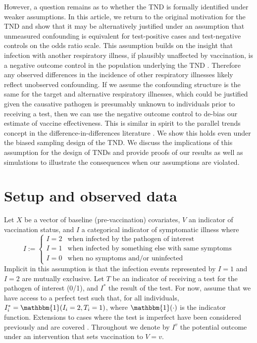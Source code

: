 \documentclass[11pt]{article}
\begin{document}
However, a question remains as to whether the TND is formally identified under weaker assumptions. In this article, we return to the original motivation for the TND and show that it may be alternatively justified under an assumption that unmeasured confounding is equivalent for test-positive cases and test-negative controls on the odds ratio scale. This assumption builds on the insight that infection with another respiratory illness, if plausibly unaffected by vaccination, is a negative outcome control in the population underlying the TND \cite{lipsitch_negative_2010,shi_selective_2020}. Therefore any observed differences in the incidence of other respiratory illnesses likely reflect unobserved confounding. If we assume the confounding structure is the same for the target and alternative respiratory illnesses, which could be justified given the causative pathogen is presumably unknown to individuals prior to receiving a test, then we can use the negative outcome control to de-bias our estimate of vaccine effectiveness. This is similar in spirit to the parallel trends concept in the difference-in-differences literature \cite{sofer_negative_2016}. We show this holds even under the biased sampling design of the TND. We discuss the implications of this assumption for the design of TNDs and provide proofs of our results as well as simulations to illustrate the consequences when our assumptions are violated.

\section{Setup and observed data} \label{sec:setup}
Let $X$ be a vector of baseline (pre-vaccination) covariates, $V$ an indicator of vaccination status, and $I$ a categorical indicator of symptomatic illness where
        $$I := \begin{cases} 
        I = 2 & \text{when infected by the pathogen of interest} \\
        I = 1 & \text{when infected by something else with same symptoms} \\
        I = 0 & \text{when no symptoms and/or uninfected}
        \end{cases}$$
Implicit in this assumption is that the infection events represented by $I = 1$ and $I = 2$ are mutually exclusive. Let $T$ be an indicator of receiving a test for the pathogen of interest (0/1), and $I^*$ the result of the test. For now, assume that we have access to a perfect test such that, for all individuals, $I^*_i = \mathbbm{1}(I_i = 2, T_i = 1)$, where $\mathbbm{1}(\cdot)$ is the indicator function. Extensions to cases where the test is imperfect have been considered previously \cite{jackson2015effects} and are covered . Throughout we denote by $I^v$ the potential outcome under an intervention that sets vaccination to $V=v$. 
    
\end{document}
